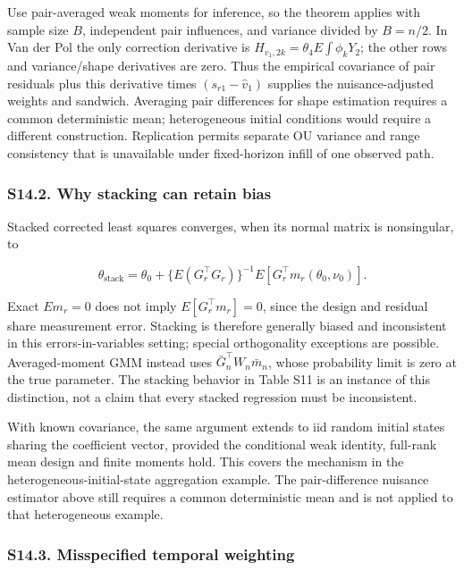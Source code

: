 \documentclass[
  american,
  11pt,
]{article}
\begin{document}
Use pair-averaged weak moments for inference, so the theorem applies
with sample size \(B\), independent pair influences, and variance
divided by \(B=n/2\). In Van der Pol the only correction derivative is
\(H_{v_1,2k}=\theta_4 E\int\phi_k Y_2\); the other rows and
variance/shape derivatives are zero. Thus the empirical covariance of
pair residuals plus this derivative times \((s_{r1}-\widehat v_1)\)
supplies the nuisance-adjusted weights and sandwich. Averaging pair
differences for shape estimation requires a common deterministic mean;
heterogeneous initial conditions would require a different construction.
Replication permits separate OU variance and range consistency that is
unavailable under fixed-horizon infill of one observed path.

\subsubsection{S14.2. Why stacking can retain
bias}\label{s14.2.-why-stacking-can-retain-bias}

Stacked corrected least squares converges, when its normal matrix is
nonsingular, to

\[
\theta_{\mathrm{stack}}=\theta_0+
\{E(G_r^\top G_r)\}^{-1}E[G_r^\top m_r(\theta_0,\nu_0)].
\]

Exact \(E m_r=0\) does not imply \(E[G_r^\top m_r]=0\), since the design
and residual share measurement error. Stacking is therefore generally
biased and inconsistent in this errors-in-variables setting; special
orthogonality exceptions are possible. Averaged-moment GMM instead uses
\(\bar G_n^\top W_n\bar m_n\), whose probability limit is zero at the
true parameter. The stacking behavior in Table S11 is an instance of
this distinction, not a claim that every stacked regression must be
inconsistent.

With known covariance, the same argument extends to iid random initial
states sharing the coefficient vector, provided the conditional weak
identity, full-rank mean design and finite moments hold. This covers the
mechanism in the heterogeneous-initial-state aggregation example. The
pair-difference nuisance estimator above still requires a common
deterministic mean and is not applied to that heterogeneous example.

\subsubsection{S14.3. Misspecified temporal
weighting}\label{s14.3.-misspecified-temporal-weighting}
\end{document}
